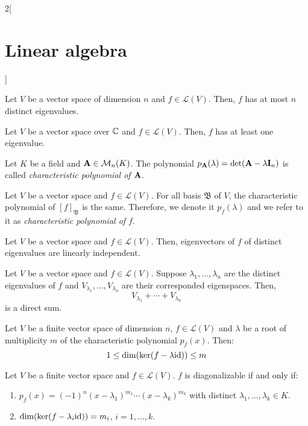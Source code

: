 \documentclass[../../../main.tex]{subfiles}
\begin{document}
\begin{multicols}{2}[\section{Linear algebra}]
\begin{corollary}
    Let $V$ be a vector space of dimension $n$ and $f\in\mathcal{L}(V)$. Then, $f$ has at most $n$ distinct eigenvalues.
  \end{corollary}
  \begin{corollary}
    Let $V$ be a vector space over $\mathbb{C}$ and $f\in\mathcal{L}(V)$. Then, $f$ has at least one eigenvalue.
  \end{corollary}
  \begin{definition}
    Let $K$ be a field and $\vb{A}\in\mathcal{M}_n(K)$. The polynomial $p_{\vb{A}}(\lambda)=\det(\vb{A}-\lambda \vb{I}_n)$ is called \textit{characteristic polynomial of $\vb{A}$}.
  \end{definition}
  \begin{prop}
    Let $V$ be a vector space and $f\in\mathcal{L}(V)$. For all basis $\mathfrak{B}$ of $V$, the characteristic polynomial of $[f]_\mathfrak{B}$ is the same. Therefore, we denote it $p_f(\lambda)$ and we refer to it as \textit{characteristic polynomial of $f$}.
  \end{prop}
  \begin{prop}
    Let $V$ be a vector space and $f\in\mathcal{L}(V)$. Then, eigenvectors of $f$ of distinct eigenvalues are linearly independent.
  \end{prop}
  \begin{corollary}
    Let $V$ be a vector space and $f\in\mathcal{L}(V)$. Suppose $\lambda_1,\ldots,\lambda_n$ are the distinct eigenvalues of $f$ and $V_{\lambda_1},\ldots,V_{\lambda_n}$ are their corresponded eigenspaces. Then, $$V_{\lambda_1}+\cdots+V_{\lambda_n}$$ is a direct sum.
  \end{corollary}
  \begin{prop}
    Let $V$ be a finite vector space of dimension $n$, $f\in\mathcal{L}(V)$ and $\lambda$ be a root of multiplicity $m$ of the characteristic polynomial $p_f(x)$. Then: $$1\leq \dim(\ker(f-\lambda\mathrm{id}))\leq m$$
  \end{prop}
  \begin{theorem}
    Let $V$ be a finite vector space and $f\in\mathcal{L}(V)$. $f$ is diagonalizable if and only if:
    \begin{enumerate}
      \item $p_f(x)=(-1)^n(x-\lambda_1)^{m_1}\cdots(x-\lambda_k)^{m_k}$ with distinct $\lambda_1,\ldots,\lambda_k\in K$.
      \item $\dim(\ker(f-\lambda_i \mathrm{id}))=m_i$, $i=1,\ldots,k$.
    \end{enumerate}

\end{theorem}
\end{multicols}
\end{document}
